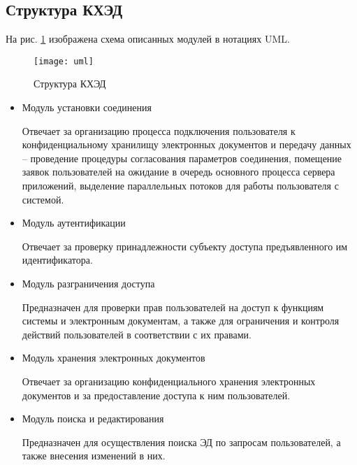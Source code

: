 \subsection{Структура КХЭД} \label{storage}

На рис. \ref{img:uml} изображена схема описанных модулей в нотациях UML.

\begin{figure}[p]
  \centering
  \texttt{[image: uml]}
  \caption{Структура КХЭД}
  \label{img:uml}
\end{figure}

\begin{itemize}
\item Модуль установки соединения

Отвечает за организацию процесса подключения пользователя к конфиденциальному хранилищу электронных документов и передачу данных -- проведение процедуры согласования параметров соединения, помещение заявок пользователей на ожидание в очередь основного процесса сервера приложений, выделение параллельных потоков для работы пользователя с системой.

\item Модуль аутентификации

Отвечает за проверку принадлежности субъекту доступа предъявленного им идентификатора.

\item Модуль разграничения доступа

Предназначен для проверки прав пользователей на доступ к функциям системы и электронным документам, а также для ограничения и контроля действий пользователей в соответствии с их правами.

\item Модуль хранения электронных документов

Отвечает за организацию конфиденциального хранения электронных документов и за предоставление доступа к ним пользователей.

\item Модуль поиска и редактирования

Предназначен для осуществления поиска ЭД по запросам пользователей, а также внесения изменений в них.

\end{itemize}
